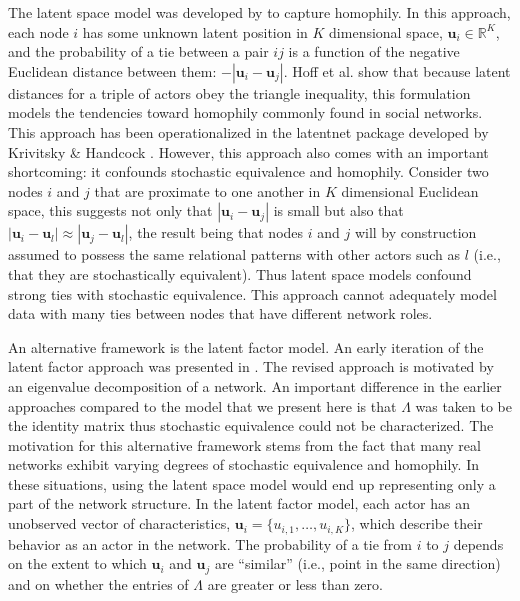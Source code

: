 \documentclass[9pt,twocolumn,twoside,lineno]{pnas-new}
\newcommand{\pkg}[1]{{\fontseries{b}\selectfont #1}}
\begin{document}
The latent space model was developed by \cite{hoff:etal:2002} to capture homophily. In this approach, each node $i$ has some unknown latent position in $K$ dimensional space, $\textbf{u}_{i} \in \mathbb{R}^{K}$, and the probability of a tie between a pair $ij$ is a function of the negative Euclidean distance between them: $-|\textbf{u}_{i} - \textbf{u}_{j}|$. Hoff et al. show that because latent distances for a triple of actors obey the triangle inequality, this formulation models the tendencies toward homophily commonly found in social networks. This approach has been operationalized in the \pkg{latentnet} package developed by Krivitsky \& Handcock \cite{krivitsky:handcock:2015}. However, this approach also comes with an important shortcoming: it confounds stochastic equivalence and homophily. Consider two nodes $i$ and $j$ that are proximate to one another in $K$ dimensional Euclidean space, this suggests not only that $|\textbf{u}_{i} - \textbf{u}_{j}|$ is small but also that $|\textbf{u}_{i} - \textbf{u}_{l}| \approx |\textbf{u}_{j} - \textbf{u}_{l}|$, the result being that nodes $i$ and $j$ will by construction assumed to possess the same relational patterns with other actors such as $l$ (i.e., that they are stochastically equivalent). Thus latent space models confound strong ties with stochastic equivalence. This approach cannot adequately model data with many ties between nodes that have different network roles.

An alternative framework is the latent factor model. An early iteration of the latent factor approach was presented in \cite{hoff:2005}. The revised approach is motivated by an eigenvalue decomposition of a network. An important difference in the earlier approaches compared to the model that we present here is that $\Lambda$ was taken to be the identity matrix thus stochastic equivalence could not be characterized. The motivation for this alternative framework stems from the fact that many real networks exhibit varying degrees of stochastic equivalence and homophily. In these situations, using the latent space model would end up representing only a part of the network structure. In the latent factor model, each actor has an unobserved vector of characteristics, $\textbf{u}_{i} = \{u_{i,1}, \ldots, u_{i,K} \}$, which describe their behavior as an actor in the network. The probability of a tie from $i$ to $j$ depends on the extent to which $\textbf{u}_{i}$ and $\textbf{u}_{j}$ are ``similar'' (i.e., point in the same direction) and on whether the entries of $\Lambda$ are greater or less than zero.
\end{document}
